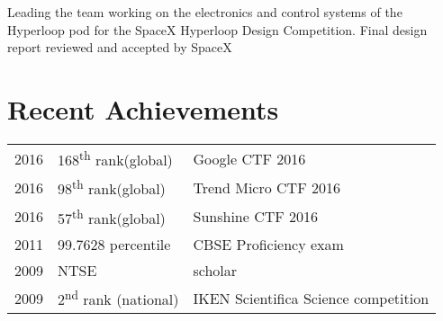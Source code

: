 \documentclass[]{illustris-resume-openfont}
\begin{document}
\begin{minipage}[t]{0.66\textwidth}

Leading the team working on the electronics and control systems of the Hyperloop pod for the SpaceX Hyperloop Design Competition. Final design report reviewed and accepted by SpaceX


\section{Recent Achievements} 
\begin{tabular}{rll}
2016    & 168\textsuperscript{th} rank(global)    & Google CTF 2016 \\
2016    & 98\textsuperscript{th} rank(global) & Trend Micro CTF 2016 \\
2016    & 57\textsuperscript{th} rank(global) & Sunshine CTF 2016 \\
2011    & 99.7628 percentile  & CBSE Proficiency exam \\
2009    & NTSE & scholar \\
2009    & 2\textsuperscript{nd} rank (national)    & IKEN Scientifica Science competition \\

\end{tabular}



\end{minipage}
\end{document}
